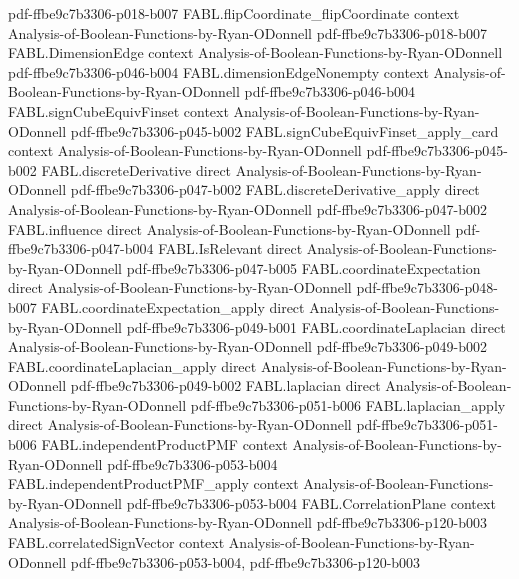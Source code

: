 \begin{theorem}
  {pdf-ffbe9c7b3306-p018-b007}
\proofstep
  {FABL.flipCoordinate_flipCoordinate}
  {context}
  {Analysis-of-Boolean-Functions-by-Ryan-ODonnell}
  {pdf-ffbe9c7b3306-p018-b007}
\proofstep
  {FABL.DimensionEdge}
  {context}
  {Analysis-of-Boolean-Functions-by-Ryan-ODonnell}
  {pdf-ffbe9c7b3306-p046-b004}
\proofstep
  {FABL.dimensionEdgeNonempty}
  {context}
  {Analysis-of-Boolean-Functions-by-Ryan-ODonnell}
  {pdf-ffbe9c7b3306-p046-b004}
\proofstep
  {FABL.signCubeEquivFinset}
  {context}
  {Analysis-of-Boolean-Functions-by-Ryan-ODonnell}
  {pdf-ffbe9c7b3306-p045-b002}
\proofstep
  {FABL.signCubeEquivFinset_apply_card}
  {context}
  {Analysis-of-Boolean-Functions-by-Ryan-ODonnell}
  {pdf-ffbe9c7b3306-p045-b002}
\proofstep
  {FABL.discreteDerivative}
  {direct}
  {Analysis-of-Boolean-Functions-by-Ryan-ODonnell}
  {pdf-ffbe9c7b3306-p047-b002}
\proofstep
  {FABL.discreteDerivative_apply}
  {direct}
  {Analysis-of-Boolean-Functions-by-Ryan-ODonnell}
  {pdf-ffbe9c7b3306-p047-b002}
\proofstep
  {FABL.influence}
  {direct}
  {Analysis-of-Boolean-Functions-by-Ryan-ODonnell}
  {pdf-ffbe9c7b3306-p047-b004}
\proofstep
  {FABL.IsRelevant}
  {direct}
  {Analysis-of-Boolean-Functions-by-Ryan-ODonnell}
  {pdf-ffbe9c7b3306-p047-b005}
\proofstep
  {FABL.coordinateExpectation}
  {direct}
  {Analysis-of-Boolean-Functions-by-Ryan-ODonnell}
  {pdf-ffbe9c7b3306-p048-b007}
\proofstep
  {FABL.coordinateExpectation_apply}
  {direct}
  {Analysis-of-Boolean-Functions-by-Ryan-ODonnell}
  {pdf-ffbe9c7b3306-p049-b001}
\proofstep
  {FABL.coordinateLaplacian}
  {direct}
  {Analysis-of-Boolean-Functions-by-Ryan-ODonnell}
  {pdf-ffbe9c7b3306-p049-b002}
\proofstep
  {FABL.coordinateLaplacian_apply}
  {direct}
  {Analysis-of-Boolean-Functions-by-Ryan-ODonnell}
  {pdf-ffbe9c7b3306-p049-b002}
\proofstep
  {FABL.laplacian}
  {direct}
  {Analysis-of-Boolean-Functions-by-Ryan-ODonnell}
  {pdf-ffbe9c7b3306-p051-b006}
\proofstep
  {FABL.laplacian_apply}
  {direct}
  {Analysis-of-Boolean-Functions-by-Ryan-ODonnell}
  {pdf-ffbe9c7b3306-p051-b006}
\proofstep
  {FABL.independentProductPMF}
  {context}
  {Analysis-of-Boolean-Functions-by-Ryan-ODonnell}
  {pdf-ffbe9c7b3306-p053-b004}
\proofstep
  {FABL.independentProductPMF_apply}
  {context}
  {Analysis-of-Boolean-Functions-by-Ryan-ODonnell}
  {pdf-ffbe9c7b3306-p053-b004}
\proofstep
  {FABL.CorrelationPlane}
  {context}
  {Analysis-of-Boolean-Functions-by-Ryan-ODonnell}
  {pdf-ffbe9c7b3306-p120-b003}
\proofstep
  {FABL.correlatedSignVector}
  {context}
  {Analysis-of-Boolean-Functions-by-Ryan-ODonnell}
  {pdf-ffbe9c7b3306-p053-b004,
    pdf-ffbe9c7b3306-p120-b003}

\end{theorem}
